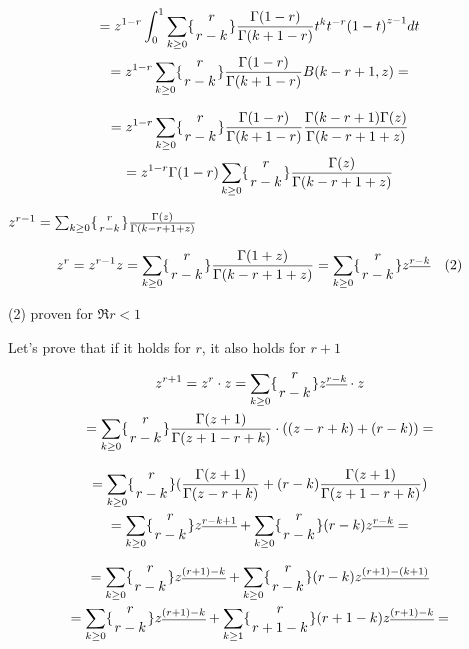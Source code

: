 \documentclass{article}
\begin{document}
\begin{multline*}
= z^{1-r} \int_{0}^{1} \sum_{k \geq 0} \{{{r} \atop {r-k}}\} \frac{\Gamma(1-r)}{\Gamma(k+1-r)} t^{k} t^{-r} {(1-t)}^{z-1} dt \\
= z^{1-r} \sum_{k \geq 0} \{{{r} \atop {r-k}}\} \frac{\Gamma(1-r)}{\Gamma(k+1-r)} B(k-r+1,z) =
\end{multline*}

\begin{multline*}
= z^{1-r} \sum_{k \geq 0} \{{{r} \atop {r-k}}\} \frac{\Gamma(1-r)}{\Gamma(k+1-r)} \frac{\Gamma(k-r+1)\Gamma(z)}{\Gamma(k-r+1+z)} \\
= z^{1-r} \Gamma(1-r) \sum_{k \geq 0} \{{{r} \atop {r-k}}\} \frac{\Gamma(z)}{\Gamma(k-r+1+z)}
\end{multline*}

\( z^{r-1} = \sum_{k \geq 0} \{{{r} \atop {r-k}}\} \frac{\Gamma(z)}{\Gamma(k-r+1+z)} \)

\[ z^{r} = z^{r-1}z = \sum_{k \geq 0} \{{{r} \atop {r-k}}\} \frac{\Gamma(1+z)}{\Gamma(k-r+1+z)} = \sum_{k \geq 0} \{{{r} \atop {r-k}}\} z^{\underline{r-k}}\quad (2) \]

(2) proven for \( \Re r < 1 \)

Let's prove that if it holds for \( r \), it also holds for \( r + 1 \)

\begin{multline*}
z^{r+1} = z^{r} \cdot z = \sum_{k \geq 0} \{{{r} \atop {r-k}}\} z^{\underline{r-k}} \cdot z \\
= \sum_{k \geq 0} \{{{r} \atop {r-k}}\} \frac{\Gamma(z+1)}{\Gamma(z+1-r+k)} \cdot ((z-r+k) + (r-k)) =
\end{multline*}

\begin{multline*}
= \sum_{k \geq 0} \{{{r} \atop {r-k}}\}( \frac{\Gamma(z+1)}{\Gamma(z-r+k)} + (r-k) \frac{\Gamma(z+1)}{\Gamma(z+1-r+k)}) \\
= \sum_{k \geq 0} \{{{r} \atop {r-k}}\}z^{\underline{r-k+1}} + \sum_{k \geq 0} \{{{r} \atop {r-k}}\}(r-k)z^{\underline{r-k}} =
\end{multline*}

\begin{multline*}
= \sum_{k \geq 0} \{{{r} \atop {r-k}}\}z^{\underline{(r+1)-k}} + \sum_{k \geq 0} \{{{r} \atop {r-k}}\}(r-k)z^{\underline{(r+1)-(k+1)}} \\
= \sum_{k \geq 0} \{{{r} \atop {r-k}}\}z^{\underline{(r+1)-k}} + \sum_{k \geq 1} \{{{r} \atop {r + 1-k}}\}(r+1-k)z^{\underline{(r+1)-k}} =
\end{multline*}
\end{document}
